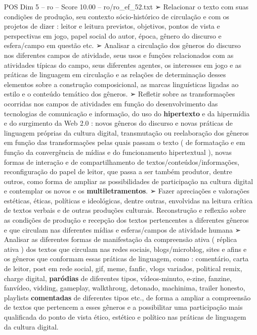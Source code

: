 \begin{textsample}{POS Dim 5 – ro – Score 10.00 – ro/ro\_ef\_52.txt}  \label{ex:f5_pos_115}
{\EmojiFont ➢} Relacionar o texto com suas condições de produção, seu contexto sócio-histórico de circulação e com os projetos de dizer : leitor e leitura previstos, objetivos, pontos de vista e perspectivas em jogo, papel social do autor, época, gênero do discurso e esfera/campo em questão etc. {\EmojiFont ➢} Analisar a circulação dos gêneros do discurso nos diferentes campos de atividade, seus usos e funções relacionados com as atividades típicas do campo, seus diferentes agentes, os interesses em jogo e as práticas de linguagem em circulação e as relações de determinação desses elementos sobre a construção composicional, as marcas linguísticas ligadas ao estilo e o conteúdo temático dos gêneros. {\EmojiFont ➢} Refletir sobre as transformações ocorridas nos campos de atividades em função do desenvolvimento das tecnologias de comunicação e informação, do uso do \textbf{hipertexto} e da hipermídia e do surgimento da Web 2.0 : novos gêneros do discurso e novas práticas de linguagem próprias da cultura digital, transmutação ou reelaboração dos gêneros em função das transformações pelas quais passam o texto ( de formatação e em função da convergência de mídias e do funcionamento hipertextual ), novas formas de interação e de compartilhamento de textos/conteúdos/informações, reconfiguração do papel de leitor, que passa a ser também produtor, dentre outros, como forma de ampliar as possibilidades de participação na cultura digital e contemplar os novos e os \textbf{multiletramentos}. {\EmojiFont ➢} Fazer apreciações e valorações estéticas, éticas, políticas e ideológicas, dentre outras, envolvidas na leitura crítica de textos verbais e de outras produções culturais.
Reconstrução e reflexão sobre as condições de produção e recepção dos textos pertencentes a diferentes gêneros e que circulam nas diferentes mídias e esferas/campos de atividade humana {\EmojiFont ➢} Analisar as diferentes formas de manifestação da compreensão ativa ( réplica ativa ) dos textos que circulam nas redes sociais, blogs/microblog, sites e afins e os gêneros que conformam essas práticas de linguagem, como : comentário, carta de leitor, post em rede social, gif, meme, fanfic, vlogs variados, political remix, charge digital, \textbf{paródias} de diferentes tipos, vídeos-minuto, e-zine, fanzine, fanvídeo, vidding, gameplay, walkthroug, detonado, machinima, trailer honesto, playlists \textbf{comentadas} de diferentes tipos etc., de forma a ampliar a compreensão de textos que pertencem a esses gêneros e a possibilitar uma participação mais qualificada do ponto de vista ético, estético e político nas práticas de linguagem da cultura digital.

\end{textsample}
